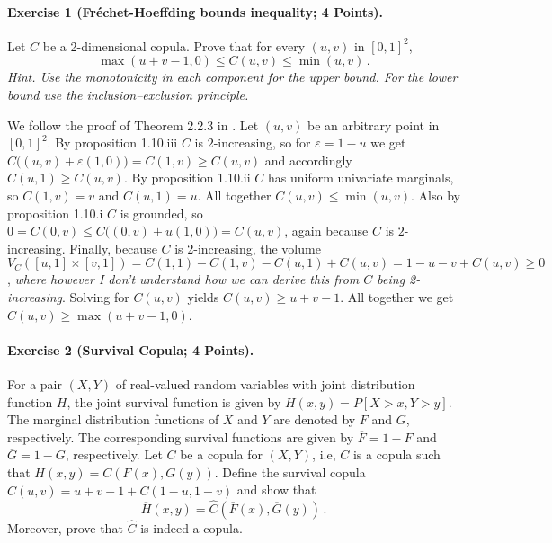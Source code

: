 \documentclass{article}
\begin{document}
\paragraph{Exercise 1 \textnormal{(Fréchet-Hoeffding bounds inequality; 4 Points)}.}
Let $C$ be a 2-dimensional copula.
Prove that for every $(u,v)$ in $[0,1]^2$,
\[
\max(u+v-1,0)\leq C(u,v)\leq\min(u,v)\,.
\]
\emph{Hint. Use the monotonicity in each component for the upper bound.
  For the lower bound use the inclusion--exclusion principle.}

We follow the proof of Theorem 2.2.3 in \cite{nelsen2006introduction}.
Let $(u,v)$ be an arbitrary point in $[0,1]^2$.
By proposition 1.10.iii $C$ is $2$-increasing, so for $\varepsilon=1-u$ we get $C\bigl((u,v)+\varepsilon(1,0)\bigr)=C(1,v)\geq C(u,v)$ and accordingly $C(u,1)\geq C(u,v)$.
By proposition 1.10.ii $C$ has uniform univariate marginals, so $C(1,v)=v$ and $C(u,1)=u$.
All together $C(u,v)\leq\min(u,v)$.
Also by proposition 1.10.i $C$ is grounded, so $0=C(0,v)\leq C\bigl((0,v)+u(1,0)\bigr)=C(u,v)$, again because $C$ is $2$-increasing.
Finally, because $C$ is 2-increasing, the volume $V_C([u,1]\times[v,1])=C(1,1)-C(1,v)-C(u,1)+C(u,v)=1-u-v+C(u,v)\geq0$, \emph{where however I don't understand how we can derive this from $C$ being 2-increasing}.
Solving for $C(u,v)$ yields $C(u,v)\geq u+v-1$.
All together we get $C(u,v)\geq\max(u+v-1,0)$.
\paragraph{Exercise 2 \textnormal{(Survival Copula; 4 Points)}.}
For a pair $(X,Y)$ of real-valued random variables with joint distribution function $H$, the joint survival function is given by $\overline{H}(x,y)=P[X>x,Y>y]$.
The marginal distribution functions of $X$ and $Y$ are denoted by $F$ and $G$, respectively.
The corresponding survival functions are given by $\overline{F}=1-F$ and $\overline{G}=1-G$, respectively.
Let $C$ be a copula for $(X,Y)$, i.e, $C$ is a copula such that $H(x,y)=C(F(x),G(y))$.
Define the survival copula $\hat{C}(u,v)=u+v-1+C(1-u,1-v)$ and show that
\[
  \overline{H}(x,y)=\hat{C}(\overline{F}(x),\overline{G}(y))\,.
\]
Moreover, prove that $\hat{C}$ is indeed a copula.
\end{document}
